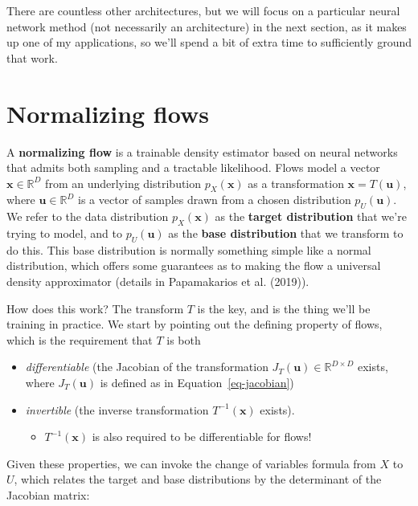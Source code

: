\documentclass[
  11pt,
  numbers=noendperiod]{book}
\providecommand{\tightlist}{%
  \setlength{\itemsep}{0pt}\setlength{\parskip}{0pt}}\usepackage{longtable,booktabs,array}
\begin{document}
There are countless other architectures, but we will focus on a
particular neural network method (not necessarily an architecture) in
the next section, as it makes up one of my applications, so we'll spend
a bit of extra time to sufficiently ground that work.

\hypertarget{sec-flows}{%
\section{Normalizing flows}\label{sec-flows}}

A \textbf{normalizing flow} is a trainable density estimator based on
neural networks that admits both sampling and a tractable likelihood.
Flows model a vector \(\mathbf{x} \in \mathbb{R}^D\) from an underlying
distribution \(p_X(\mathbf{x})\) as a transformation
\(\mathbf{x} = T(\mathbf{u})\), where \(\mathbf{u} \in \mathbb{R}^D\) is
a vector of samples drawn from a chosen distribution
\(p_U(\mathbf{u})\). We refer to the data distribution
\(p_X(\mathbf{x})\) as the \textbf{target distribution} that we're
trying to model, and to \(p_U(\mathbf{u})\) as the \textbf{base
distribution} that we transform to do this. This base distribution is
normally something simple like a normal distribution, which offers some
guarantees as to making the flow a universal density approximator
(details in Papamakarios et al. (2019)).

How does this work? The transform \(T\) is the key, and is the thing
we'll be training in practice. We start by pointing out the defining
property of flows, which is the requirement that \(T\) is both

\begin{itemize}
\tightlist
\item
  \emph{differentiable} (the Jacobian of the transformation
  \(J_T(\mathbf{u}) \in \mathbb{R}^{D\times D}\) exists, where
  \(J_T(\mathbf{u})\) is defined as in Equation~\ref{eq-jacobian})
\item
  \emph{invertible} (the inverse transformation \(T^{-1}(\mathbf{x})\)
  exists).

  \begin{itemize}
  \tightlist
  \item
    \(T^{-1}(\mathbf{x})\) is also required to be differentiable for
    flows!
  \end{itemize}
\end{itemize}

Given these properties, we can invoke the change of variables formula
from \(X\) to \(U\), which relates the target and base distributions by
the determinant of the Jacobian matrix:
\end{document}
